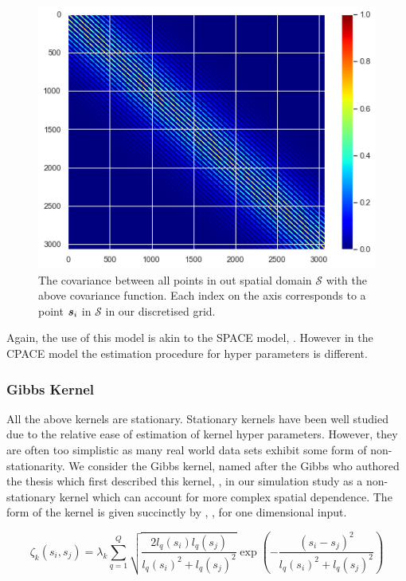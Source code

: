 \begin{figure}
	\centering
	\includegraphics[width=\textwidth]{ex_mat_3}
	\caption{The covariance between all points in out spatial domain $\mathcal{S}$ with the above covariance function. Each index on the axis corresponds to a point $\bm{{s}}_i$ in $\mathcal{S}$ in our discretised grid.}
	\label{fig:ex_mat_3}
\end{figure}

Again, the use of this model is akin to the SPACE model, \citep{liu_functional_2017}.
However in the CPACE model the estimation procedure for hyper parameters is different.

\subsubsection{Gibbs Kernel \label{sssec:gibbs}}
All the above kernels are stationary.
Stationary kernels have been well studied due to the relative ease of estimation of kernel hyper parameters.
However, they are often too simplistic as many real world data sets exhibit some form of non-stationarity.
We consider the Gibbs kernel, named after the Gibbs who authored the thesis which first described this kernel, \citep{gibbs_bayesian_1998}, in our simulation study as a non-stationary kernel which can account for more complex spatial dependence.
The form of the kernel is given succinctly by \citeauthor{paciorek_spatial_2006}, \citep{paciorek_spatial_2006}, for one dimensional input. 

\begin{equation}
	\zeta_k\left(s_{i}, s_{j}\right) = \lambda_k \sum_{q=1}^{Q} \sqrt{\frac{2l_q(s_i)l_q(s_j)}{l_q(s_i)^2 + l_q(s_j)^2}} \exp \left(-\frac{\left(s_i - s_j\right)^2}{l_q(s_i)^2 + l_q(s_j)^2}\right)
\end{equation}

